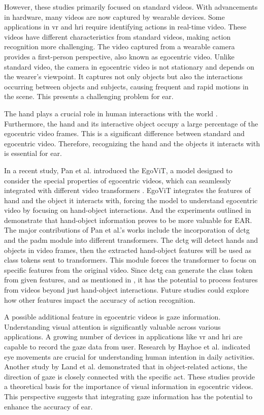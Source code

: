 However, these studies primarily focused on standard videos. With advancements in hardware, many videos are now captured by wearable devices. Some applications in \gls{vr} and \gls{hri} require identifying actions in real-time video. These videos have different characteristics from standard videos, making action recognition more challenging. The video captured from a wearable camera provides a first-person perspective, also known as egocentric video. Unlike standard video, the camera in egocentric video is not stationary and depends on the wearer’s viewpoint. It captures not only objects but also the interactions occurring between objects and subjects, causing frequent and rapid motions in the scene. This presents a challenging problem for \gls{ear}.

The hand plays a crucial role in human interactions with the world \cite{shan_understanding_2020}. Furthermore, the hand and its interactive object occupy a large percentage of the egocentric video frames. This is a significant difference  between standard and egocentric video. Therefore, recognizing the hand and the objects it interacts with is essential for \gls{ear}.

In a recent study, Pan et al. introduced the EgoViT, a model designed to consider the special properties of egocentric videos, which can seamlessly integrated with different video transformers \cite{pan_egovit_2023}. EgoViT integrates the features of hand and the object it interacts with, forcing the model to understand egocentric video by focusing on hand-object interactions. And the experiments outlined in \cite{pan_egovit_2023} demonstrate that hand-object information proves to be more valuable for EAR. The major contributions of Pan et al.'s works include the incorporation of \gls{dctg} and the \gls{padm} module into different transformers. The \gls{dctg} will detect hands and objects in video frames, then the extracted hand-object features will be used as class tokens sent to transformers. This module forces the transformer to focus on specific features from the original video. Since \gls{dctg} can generate the class token from given features, and as mentioned in \cite{pan_egovit_2023}, it has the potential to process features from videos beyond just hand-object interactions. Future studies could explore how other features impact the accuracy of action recognition.

A possible additional feature in egocentric videos is gaze information. Understanding visual attention is significantly valuable across various applications. A growing number of devices in applications like \gls{vr} and \gls{hri} are capable to record the gaze data from user. Research by Hayhoe et al. \cite{hayhoe_eye_2005} indicated eye movements are crucial for understanding human intention in daily activities. Another study by Land et al. \cite{land_roles_1999} demonstrated that in object-related actions, the direction of gaze is closely connected with the specific act. These studies provide a theoretical basis for the importance of visual information in egocentric videos. This perspective suggests that integrating gaze information has the potential to enhance the accuracy of  \gls{ear}.

